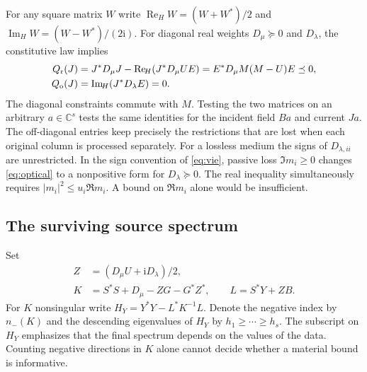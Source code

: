 \documentclass[anonymous,12pt]{iopjournal}
\theoremstyle{remark}\newtheorem{remark}[theorem]{Remark}
\newcommand{\C}{\mathbb C}\newcommand{\R}{\mathbb R}
\newcommand{\Herm}{\operatorname{Re}_{\!H}}\newcommand{\Imag}{\operatorname{Im}_{\!H}}
\newcommand{\Dpos}{D_{\mu}}\newcommand{\Dopt}{D_{\lambda}}
\numberwithin{equation}{section}
\begin{document}
For any square matrix $W$ write $\Herm W=(W+W^*)/2$ and $\Imag W=(W-W^*)/(2\mathrm i)$. For diagonal real weights $\Dpos\succeq0$ and $\Dopt$, the constitutive law implies
\begin{align}
 Q_{\rm r}(J)&=J^*\Dpos J-\Herm(J^*\Dpos U E)
       =E^*\Dpos M(M-U)E\preceq0,\label{eq:sector}\\
 Q_{\rm o}(J)&=\Imag(J^*\Dopt E)=0.\label{eq:optical}
\end{align}
The diagonal constraints commute with $M$. Testing the two matrices on an arbitrary $a\in\C^s$ tests the same identities for the incident field $Ba$ and current $Ja$. The off-diagonal entries keep precisely the restrictions that are lost when each original column is processed separately. For a lossless medium the signs of $D_{\lambda,ii}$ are unrestricted. In the sign convention of \eqref{eq:vie}, passive loss $\Im m_i\ge0$ changes \eqref{eq:optical} to a nonpositive form for $\Dopt\succeq0$. The real inequality simultaneously requires $|m_i|^2\le u_i\Re m_i$. A bound on $\Re m_i$ alone would be insufficient.

\subsection{The surviving source spectrum}
Set
\begin{align}
 Z&=(\Dpos U+\mathrm i\Dopt)/2,\nonumber\\
 K&=S^*S+\Dpos-ZG-G^*Z^*,\qquad L=S^*Y+ZB. \label{eq:operators}
\end{align}
For $K$ nonsingular write $H_Y=Y^*Y-L^*K^{-1}L$. Denote the negative index by $n_-(K)$ and the descending eigenvalues of $H_Y$ by $h_1\ge\cdots\ge h_s$. The subscript on $H_Y$ emphasizes that the final spectrum depends on the values of the data. Counting negative directions in $K$ alone cannot decide whether a material bound is informative.
\end{document}
